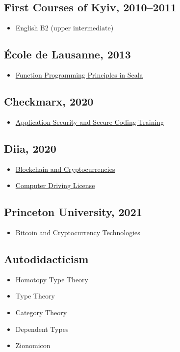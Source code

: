 \subsection*{First Courses of Kyiv, 2010–2011}
\begin{itemize}
  \item English B2 (upper intermediate)
\end{itemize}

\subsection*{École de Lausanne, 2013}
\begin{itemize}
  \item \href{https://tellnobody.space/cv/cert/fp.pdf}{Function Programming Principles in Scala}
\end{itemize}

\subsection*{Checkmarx, 2020}
\begin{itemize}
  \item \href{https://tellnobody.space/cv/cert/sec.pdf}{Application Security and Secure Coding Training}
\end{itemize}

\subsection*{Diia, 2020}
\begin{itemize}
  \item \href{https://tellnobody.space/cv/cert/crypto.pdf}{Blockchain and Cryptocurrencies}
  \item \href{https://tellnobody.space/cv/cert/cdl.pdf}{Computer Driving License}
\end{itemize}

\subsection*{Princeton University, 2021}
\begin{itemize}
  \item Bitcoin and Cryptocurrency Technologies
\end{itemize}

\subsection*{Autodidacticism}
\begin{itemize}
  \item Homotopy Type Theory
  \item Type Theory
  \item Category Theory
  \item Dependent Types
  \item Zionomicon
\end{itemize}

